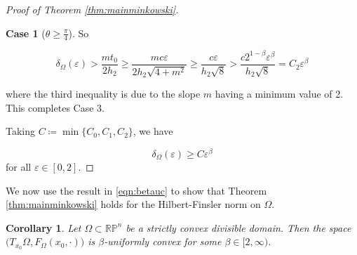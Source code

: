 \documentclass[letterpaper, 11pt, reqno]{amsart}
\newtheorem{cor}[thm]{Corollary}
\theoremstyle{definition}
\newtheorem{rem}[thm]{Remark}
\newtheorem{case}{Case}
\begin{document}
\begin{proof}[Proof of Theorem \ref{thm:mainminkowski}]
\begin{case}[$\theta \geq \frac{\pi}{4}$]
So

\begin{equation*}
    \delta_\Omega (\varepsilon) > \frac{mt_0}{2h_2} \geq \frac{mc\varepsilon}{2h_2\sqrt{4+m^2}} \geq \frac{c\varepsilon}{h_2\sqrt{8}} >  \frac{c2^{1-\beta}\varepsilon^\beta}{h_2\sqrt{8}} = C_2\varepsilon^\beta
\end{equation*}

where the third inequality is due to the slope $m$ having a minimum value of 2. This completes Case 3.
\end{case}

Taking $C \coloneq \min \{C_0, C_1, C_2 \}$, we have

\begin{equation}\label{eqn:betauc}
    \delta_\Omega(\varepsilon) \geq C\varepsilon^\beta
\end{equation}
for all $\varepsilon \in [0,2]$.
\end{proof}


We now use the result in \ref{eqn:betauc} to show that Theorem \ref{thm:mainminkowski} holds for the Hilbert-Finsler norm on $\Omega$.

\begin{cor}\label{cor:mainfinsler}
    Let $\Omega \subset \mathbb{RP}^n$ be a strictly convex divisible domain. Then the space $\big(T_{x_0}\Omega, F_\Omega(x_0, \cdot)\big)$ is $\beta$-uniformly convex for some $\beta \in [2, \infty)$.
\end{cor}
\end{document}
